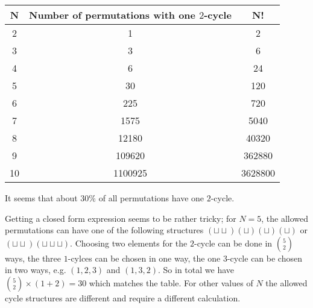 \vspace{2mm}

\begin{tabular}{ccc}
  N & Number of permutations with one $2$-cycle & N! \\ \hline
  2 & 1 & 2 \\
  3 & 3 & 6 \\
  4 & 6 & 24 \\
  5 & 30 & 120 \\
  6 & 225 & 720 \\
  7 & 1575 & 5040 \\
  8 & 12180 & 40320 \\
  9 & 109620 & 362880 \\
  10 & 1100925 & 3628800 
\end{tabular}

\vspace{2mm}

It seems that about $30\%$ of all permutations have one $2$-cycle.

Getting a closed form expression seems to be rather tricky; for $N=5$, the allowed permutations can have one of the following structures $(\sqcup \sqcup)(\sqcup)(\sqcup)(\sqcup)$ or $(\sqcup\sqcup)(\sqcup\sqcup\sqcup)$. Choosing two elements for the $2$-cycle can be done in ${5 \choose 2}$ ways, the three $1$-cylces can be chosen in one way, the one $3$-cycle can be chosen in two ways, e.g. $(1,2,3)$ and $(1,3,2)$. So in total we have ${5 \choose 2} \times (1 + 2) = 30$ which matches the table. For other values of $N$ the allowed cycle structures are different and require a different calculation.

